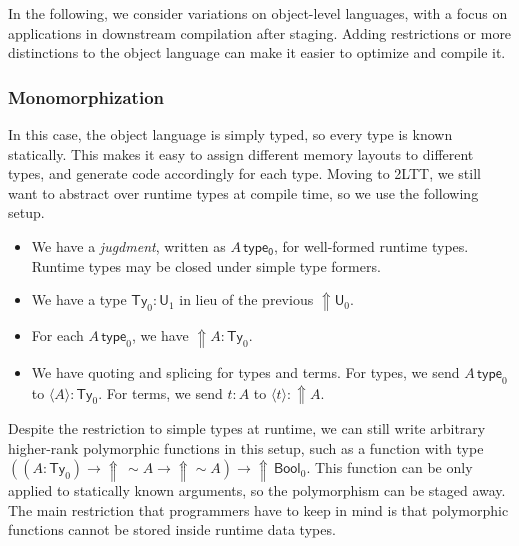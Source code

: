 \documentclass[acmsmall]{acmart}
\newcommand{\msf}[1]{\mathsf{#1}}
\newcommand{\Lift}{{\Uparrow}}
\newcommand{\spl}{{\sim}}
\newcommand{\qut}[1]{\langle #1\rangle}
\renewcommand{\U}{\msf{U}}
\newcommand{\Ty}{\msf{Ty}}
\newcommand{\Bool}{\msf{Bool}}
\theoremstyle{remark}
\begin{document}


In the following, we consider variations on object-level languages, with a focus
on applications in downstream compilation after staging. Adding restrictions or
more distinctions to the object language can make it easier to optimize and
compile it.



\subsubsection{Monomorphization}

In this case, the object language is simply typed, so every type is known
statically. This makes it easy to assign different memory layouts to different
types, and generate code accordingly for each type. Moving to 2LTT, we still
want to abstract over runtime types at compile time, so we use the following
setup.
\begin{itemize}
\item We have a \emph{jugdment}, written as $A\,\msf{type_0}$, for well-formed
  runtime types. Runtime types may be closed under simple type formers.
\item We have a type $\Ty_0 : \U_1$ in lieu of the previous $\Lift \U_0$.
\item For each $A\,\msf{type}_0$, we have $\Lift A : \Ty_0$.
\item We have quoting and splicing for types and terms. For types, we send $A\,
  \msf{type}_0$ to $\qut{A} : \Ty_0$. For terms, we send $t : A$ to $\qut{t} :
  \Lift A$.
\end{itemize}
Despite the restriction to simple types at runtime, we can still write arbitrary
higher-rank polymorphic functions in this setup, such as a function with type
$((A : \Ty_0) \to \Lift\,\spl A \to \Lift \spl A) \to \Lift\,\Bool_0$. This
function can be only applied to statically known arguments, so the polymorphism
can be staged away. The main restriction that programmers have to keep in mind
is that polymorphic functions cannot be stored inside runtime data types.
\end{document}

